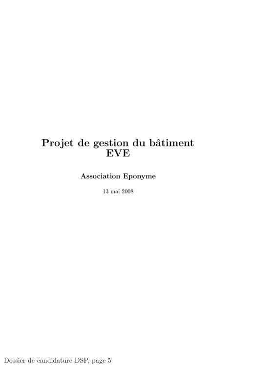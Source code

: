 \includegraphics[scale=0.85,trim=20mm 20mm 20mm 20mm,clip,page=5]{annexes/candidature_dsp.pdf} \\
Dossier de candidature DSP, page 5
\newpage
